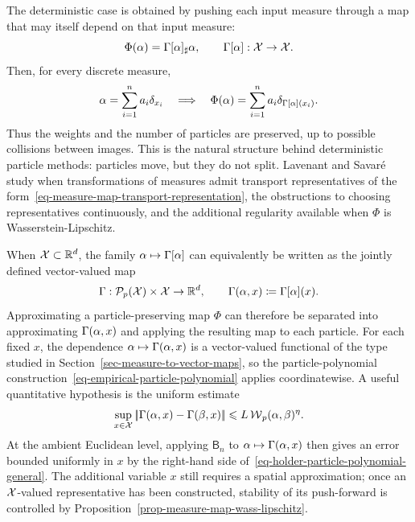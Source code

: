 The deterministic case is obtained by pushing each input measure through a map that may itself depend on that input measure:
\begin{equation}\label{eq-measure-map-transport-representation}
	\Phi(\alpha) = \Gamma[\alpha]_\sharp \alpha,
	\qquad
	\Gamma[\alpha] : \mathcal{X} \to \mathcal{X}.
\end{equation}
Then, for every discrete measure,
\begin{equation}\label{eq-measure-map-preserve-atoms}
	\alpha=\sum_{i=1}^n a_i\delta_{x_i}
	\quad\Longrightarrow\quad
	\Phi(\alpha)=\sum_{i=1}^n a_i\delta_{\Gamma[\alpha](x_i)}.
\end{equation}
Thus the weights and the number of particles are preserved, up to possible collisions between images. This is the natural structure behind deterministic particle methods: particles move, but they do not split. Lavenant and Savar\'e~\cite{LavenantSavare2026ContinuousTransformations} study when transformations of measures admit transport representatives of the form~\eqref{eq-measure-map-transport-representation}, the obstructions to choosing representatives continuously, and the additional regularity available when $\Phi$ is Wasserstein-Lipschitz.

When \(\mathcal{X}\subset\mathbb{R}^d\), the family \(\alpha\mapsto\Gamma[\alpha]\) can equivalently be written as the jointly defined vector-valued map
\begin{equation}\label{eq-curried-transport-representative}
	\Gamma:\mathcal{P}_p(\mathcal{X})\times\mathcal{X}\to\mathbb{R}^d,
	\qquad
	\Gamma(\alpha,x)\coloneqq\Gamma[\alpha](x).
\end{equation}
Approximating a particle-preserving map \(\Phi\) can therefore be separated into approximating \(\Gamma(\alpha,x)\) and applying the resulting map to each particle. For each fixed \(x\), the dependence \(\alpha\mapsto\Gamma(\alpha,x)\) is a vector-valued functional of the type studied in Section~\ref{sec-measure-to-vector-maps}, so the particle-polynomial construction~\eqref{eq-empirical-particle-polynomial} applies coordinatewise. A useful quantitative hypothesis is the uniform estimate
\[
	\sup_{x\in\mathcal{X}}
	|\!| \Gamma(\alpha,x)-\Gamma(\beta,x) |\!|
	\leqslant
	L\operatorname{\mathcal{W}}_p(\alpha,\beta)^\eta.
\]
At the ambient Euclidean level, applying \(\mathsf B_n\) to \(\alpha\mapsto\Gamma(\alpha,x)\) then gives an error bounded uniformly in \(x\) by the right-hand side of~\eqref{eq-holder-particle-polynomial-general}. The additional variable \(x\) still requires a spatial approximation; once an \(\mathcal{X}\)-valued representative has been constructed, stability of its push-forward is controlled by Proposition~\ref{prop-measure-map-wass-lipschitz}.

